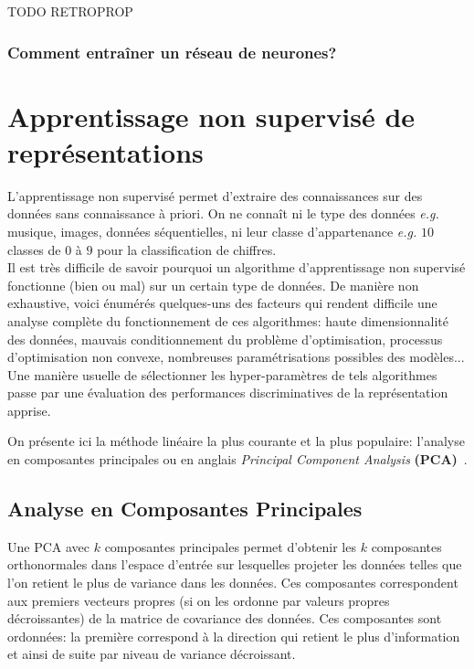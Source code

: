 TODO RETROPROP

\subsubsection{Comment entraîner un réseau de neurones?}



\section{Apprentissage non supervisé de représentations}

L'apprentissage non supervisé permet d'extraire des connaissances sur des
données sans connaissance à priori. On ne connaît ni le type des données
\textit{e.g.} musique, images, données séquentielles, ni leur classe
d'appartenance \textit{e.g.} $10$ classes de $0$ à $9$ pour la classification
de chiffres.  \\

Il est très difficile de savoir pourquoi un algorithme d'apprentissage non
supervisé fonctionne (bien ou mal) sur un certain type de données.  De manière
non exhaustive, voici énumérés quelques-uns des facteurs qui rendent difficile
une analyse complète du fonctionnement de ces algorithmes: haute
dimensionnalité des données, mauvais conditionnement du problème
d'optimisation, processus d'optimisation non convexe, nombreuses
paramétrisations possibles des modèles...  \\

Une manière usuelle de sélectionner les hyper-paramètres de tels algorithmes passe 
par une évaluation des performances discriminatives de la
représentation apprise.

On présente ici la méthode linéaire la plus courante et la plus populaire:
l'analyse en composantes principales ou en anglais \textit{Principal Component
Analysis} \textbf{(PCA)}~\cite{Pearson-1901,Hotelling1933}.

\subsection{Analyse en Composantes Principales} \label{sec:pca}

Une PCA avec $k$ composantes principales permet d'obtenir les $k$ composantes
orthonormales dans l'espace d'entrée sur lesquelles projeter les données telles
que l'on retient le plus de variance dans les données. Ces composantes
correspondent aux premiers vecteurs propres (si on les ordonne par valeurs
propres décroissantes) de la matrice de covariance des données.  Ces
composantes sont ordonnées: la première correspond à la direction qui retient
le plus d'information et ainsi de suite par niveau de variance décroissant.

